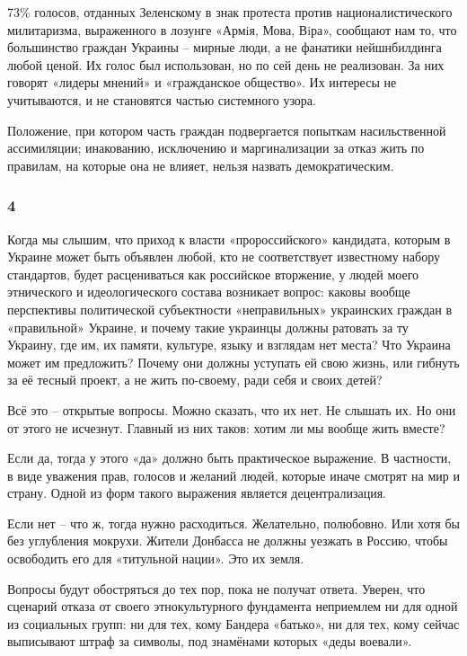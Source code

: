 73\% голосов, отданных Зеленскому в знак протеста против националистического
милитаризма, выраженного в лозунге «Армiя, Мова, Вiра», сообщают нам то, что
большинство граждан Украины – мирные люди, а не фанатики нейшнбилдинга любой
ценой. Их голос был использован, но по сей день не реализован. За них говорят
«лидеры мнений» и «гражданское общество». Их интересы не  учитываются, и не
становятся частью системного узора.  

Положение, при котором часть граждан подвергается попыткам насильственной
ассимиляции; инакованию, исключению и маргинализации за отказ жить по правилам,
на которые она не влияет, нельзя назвать демократическим.

\subsubsection{4}

Когда мы слышим, что приход к власти «пророссийского» кандидата, которым в
Украине может быть объявлен любой, кто не соответствует известному набору
стандартов, будет расцениваться как российское вторжение, у людей моего
этнического и идеологического состава возникает вопрос: каковы вообще
перспективы политической субъектности «неправильных» украинских граждан в
«правильной» Украине, и почему такие украинцы должны ратовать за ту Украину,
где им, их памяти, культуре, языку и взглядам нет места? Что Украина может им
предложить? Почему они должны уступать ей свою жизнь, или гибнуть за её тесный
проект, а не жить по-своему, ради себя и своих детей?

Всё это – открытые вопросы. Можно сказать, что их нет. Не слышать их. Но они от
этого не исчезнут. Главный из них таков: хотим ли мы вообще жить вместе?

Если да, тогда у этого «да» должно быть практическое выражение. В частности, в
виде уважения прав, голосов и желаний людей, которые иначе смотрят на мир и
страну. Одной из форм такого выражения является децентрализация.

Если нет – что ж, тогда нужно расходиться. Желательно, полюбовно. Или хотя бы
без углубления мокрухи. Жители Донбасса не должны уезжать в Россию, чтобы
освободить его для «титульной нации». Это их земля.

Вопросы будут обостряться до тех пор, пока не получат ответа. Уверен, что
сценарий отказа от своего этнокультурного фундамента неприемлем ни для одной из
социальных групп: ни для тех, кому Бандера «батько», ни для тех, кому сейчас
выписывают штраф за символы, под знамёнами которых «деды воевали». 

